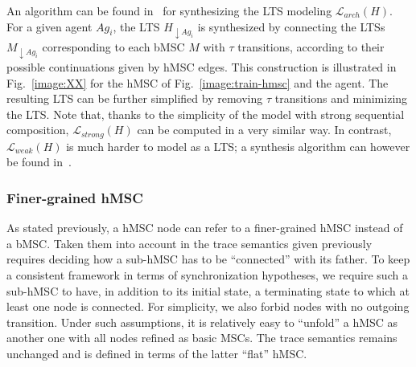 An algorithm can be found in~\cite{Uchitel:2004} for synthesizing the LTS modeling $\mathcal{L}_{arch}(H)$. For a given agent $Ag_{i}$, the LTS $H_{\downarrow Ag_i}$ is synthesized by connecting the LTSs $M_{\downarrow Ag_i}$ corresponding to each bMSC $M$ with $\tau$ transitions, according to their possible continuations given by hMSC edges. This construction is illustrated in Fig.~\ref{image:XX} for the hMSC of Fig.~\ref{image:train-hmsc} and the  agent. The resulting LTS can be further simplified by removing $\tau$ transitions and minimizing the LTS.  Note that, thanks to the simplicity of the model with strong sequential composition, $\mathcal{L}_{strong}(H)$ can be computed in a very similar way. In contrast, $\mathcal{L}_{weak}(H)$ is much harder to model as a LTS; a synthesis algorithm can however be found in~\cite{Uchitel:2004}.


\subsubsection*{Finer-grained hMSC}

As stated previously, a hMSC node can refer to a finer-grained hMSC instead of a bMSC. Taken them into account in the trace semantics given previously requires deciding how a sub-hMSC has to be ``connected'' with its father. To keep a consistent framework in terms of synchronization hypotheses, we require such a sub-hMSC to have, in addition to its initial state, a terminating state to which at least one node is connected. For simplicity, we also forbid nodes with no outgoing transition. Under such assumptions, it is relatively easy to ``unfold'' a hMSC as another one with all nodes refined as basic MSCs. The trace semantics remains unchanged and is defined in terms of the latter ``flat'' hMSC. 

